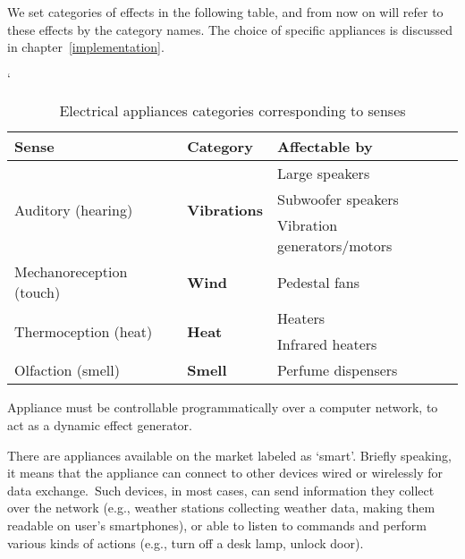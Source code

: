 We set categories of effects in the following table, and from now on will
refer to these effects by the category names. The choice of specific appliances
is discussed in chapter~\ref{implementation}.

  \begin{table}[H]
  \catcode`
  \centering
  \begin{tabular}{|l|l|l|}
  \hline
  \textbf{Sense}                          & \textbf{Category}                    & \textbf{Affectable by}      \\ \hline
  \multirow{3}{*}{Auditory (hearing)}     & \multirow{3}{*}{\textbf{Vibrations}} & Large speakers              \\ \cline{3-3} 
                                          &                                      & Subwoofer speakers          \\ \cline{3-3} 
                                          &                                      & Vibration generators/motors \\ \hline
  Mechanoreception (touch) & \textbf{Wind}                        & Pedestal fans               \\ \hline
  \multirow{2}{*}{Thermoception (heat)}   & \multirow{2}{*}{\textbf{Heat}}       & Heaters                     \\ \cline{3-3} 
                                          &                                      & Infrared heaters            \\ \hline
  Olfaction (smell)                       & \textbf{Smell}                       & Perfume dispensers          \\ \hline
  \end{tabular}
  \caption{Electrical appliances categories corresponding to senses}
  \end{table}

Appliance must be controllable programmatically over a computer network,
to act as a dynamic effect generator.

\pagebreak

There are appliances available on the market labeled as `smart'.
Briefly speaking, it means that the appliance
can connect to other devices wired or wirelessly for data exchange.\,\cite{wisd}
Such devices, in most cases, can send information they collect over
the network (e.g., weather stations collecting weather data, making them readable
on user’s smartphones), or able to listen to commands and perform various
kinds of actions (e.g., turn off a desk lamp, unlock door).


